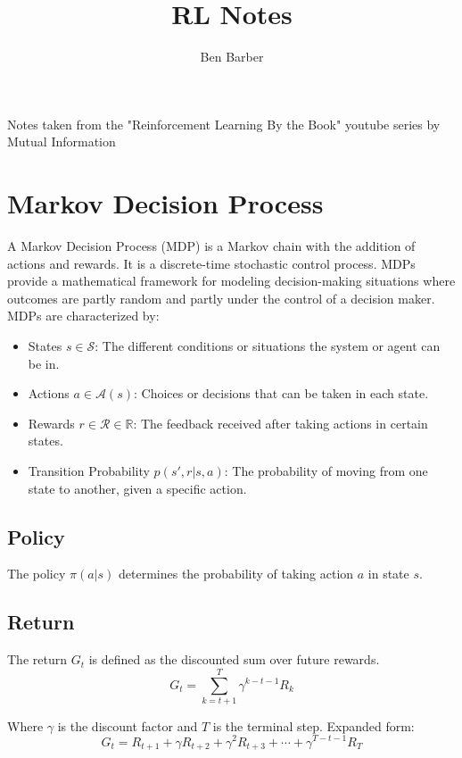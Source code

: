 \documentclass{article}
\title{RL Notes}
\author{Ben Barber}
\begin{document}
\maketitle
\begin{center}
  Notes taken from the "Reinforcement Learning By the Book" youtube series by Mutual Information
\end{center}



\section{Markov Decision Process}

A Markov Decision Process (MDP) is a Markov chain with the addition of actions and rewards. It is a discrete-time stochastic control process.
MDPs provide a mathematical framework for modeling decision-making situations where outcomes are partly random and partly under the control of a decision maker.
MDPs are characterized by:
\begin{itemize}
  \item States $s \in \mathcal{S}$: The different conditions or situations the system or agent can be in.
  \item Actions $a \in \mathcal{A}(s)$: Choices or decisions that can be taken in each state.
  \item Rewards $r \in \mathcal{R} \in \mathbb{R} $: The feedback received after taking actions in certain states.
  \item Transition Probability $p(s',r|s,a)$: The probability of moving from one state to another, given a specific action.
\end{itemize}

\subsection{Policy}
The policy $\pi(a|s)$ determines the probability of taking action $a$ in state $s$.

\subsection{Return}
\label{sec:return}
The return $G_t$ is defined as the discounted sum over future rewards.
\begin{equation}
  G_t = \sum_{k=t+1}^{T}\gamma^{k-t-1}R_k
\end{equation}

Where $\gamma$ is the discount factor and $T$ is the terminal step. Expanded form:
\begin{equation*}
  G_t = R_{t+1} + \gamma R_{t+2} + \gamma ^2 R_{t+3} + \cdots + \gamma ^{T-t-1} R_T
\end{equation*}
\end{document}
